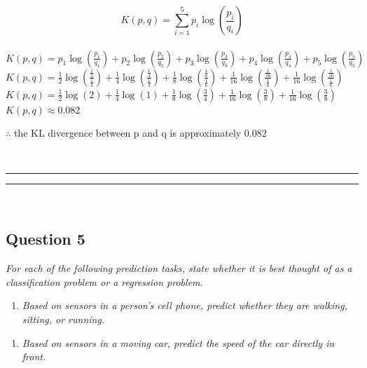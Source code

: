 \documentclass{article}
\begin{document}
$$K(p,q) = \sum^5_{i=1} p_i \log\left(\frac{p_i}{q_i}\right)$$\\

$K(p,q) = p_1 \log\left(\frac{p_1}{q_1}\right) + p_2 \log\left(\frac{p_2}{q_2}\right) + p_3 \log\left(\frac{p_3}{q_3}\right) + p_4 \log\left(\frac{p_4}{q_4}\right) + p_5 \log\left(\frac{p_5}{q_5}\right)$\\

$K(p,q) = \frac{1}{2} \log\left(\frac{\frac{1}{2}}{\frac{1}{4}}\right) + \frac{1}{4} \log\left(\frac{\frac{1}{4}}{\frac{1}{4}}\right) + \frac{1}{8} \log\left(\frac{\frac{1}{8}}{\frac{1}{6}}\right) + \frac{1}{16} \log\left(\frac{\frac{1}{16}}{\frac{1}{6}}\right) + \frac{1}{16} \log\left(\frac{\frac{1}{16}}{\frac{1}{6}}\right)$\\

$K(p,q) = \frac{1}{2} \log(2) + \frac{1}{4} \log(1) + \frac{1}{8} \log\left(\frac{3}{4}\right) + \frac{1}{16} \log\left(\frac{3}{8}\right) + \frac{1}{16} \log\left(\frac{3}{8}\right)$\\

$K(p,q) \approx 0.082$\\

\parbox{\textwidth}{$\therefore$ the KL divergence between p and q is approximately $0.082$ }\\

\noindent\rule{\textwidth}{0.4pt}
\noindent\rule{\textwidth}{0.4pt}\\

\newpage

\newpage

\subsection*{Question 5}
\textit{For each of the following prediction tasks, state whether it is best thought of as a classification problem
or a regression problem.}\\

\begin{enumerate}[label=(a)]
  \item \textit{Based on sensors in a person's cell phone, predict whether they are walking, sitting, or running.}
\end{enumerate}

\begin{enumerate}[label=(b)]
  \item \textit{Based on sensors in a moving car, predict the speed of the car directly in front.}
\end{enumerate}
\end{document}
